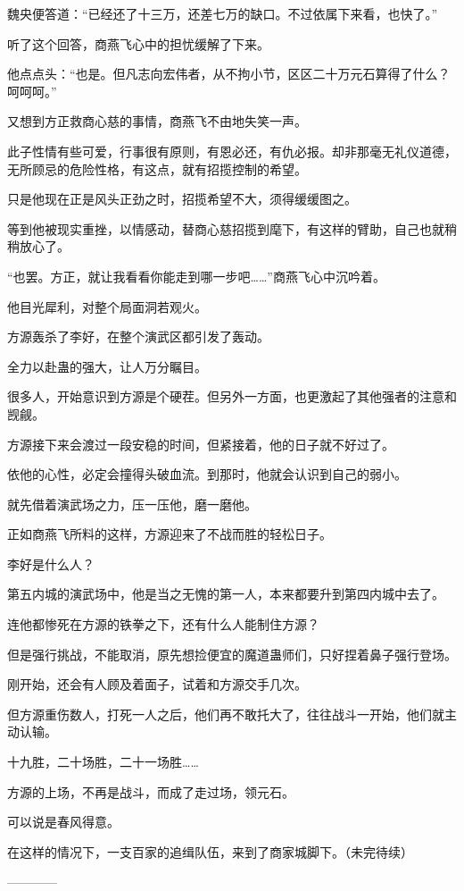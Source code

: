 \begin{this_body}
魏央便答道：“已经还了十三万，还差七万的缺口。不过依属下来看，也快了。”

听了这个回答，商燕飞心中的担忧缓解了下来。

他点点头：“也是。但凡志向宏伟者，从不拘小节，区区二十万元石算得了什么？呵呵呵。”

又想到方正救商心慈的事情，商燕飞不由地失笑一声。

此子性情有些可爱，行事很有原则，有恩必还，有仇必报。却非那毫无礼仪道德，无所顾忌的危险性格，有这点，就有招揽控制的希望。

只是他现在正是风头正劲之时，招揽希望不大，须得缓缓图之。

等到他被现实重挫，以情感动，替商心慈招揽到麾下，有这样的臂助，自己也就稍稍放心了。

“也罢。方正，就让我看看你能走到哪一步吧……”商燕飞心中沉吟着。

他目光犀利，对整个局面洞若观火。

方源轰杀了李好，在整个演武区都引发了轰动。

全力以赴蛊的强大，让人万分瞩目。

很多人，开始意识到方源是个硬茬。但另外一方面，也更激起了其他强者的注意和觊觎。

方源接下来会渡过一段安稳的时间，但紧接着，他的日子就不好过了。

依他的心性，必定会撞得头破血流。到那时，他就会认识到自己的弱小。

就先借着演武场之力，压一压他，磨一磨他。

正如商燕飞所料的这样，方源迎来了不战而胜的轻松日子。

李好是什么人？

第五内城的演武场中，他是当之无愧的第一人，本来都要升到第四内城中去了。

连他都惨死在方源的铁拳之下，还有什么人能制住方源？

但是强行挑战，不能取消，原先想捡便宜的魔道蛊师们，只好捏着鼻子强行登场。

刚开始，还会有人顾及着面子，试着和方源交手几次。

但方源重伤数人，打死一人之后，他们再不敢托大了，往往战斗一开始，他们就主动认输。

十九胜，二十场胜，二十一场胜……

方源的上场，不再是战斗，而成了走过场，领元石。

可以说是春风得意。

在这样的情况下，一支百家的追缉队伍，来到了商家城脚下。（未完待续）

------------

\end{this_body}

